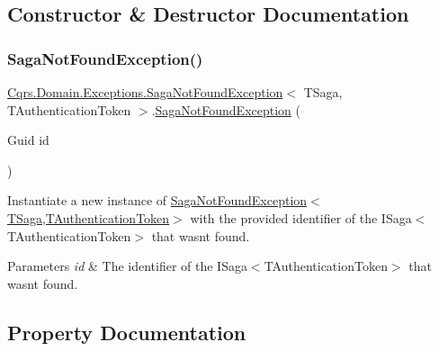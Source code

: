 \subsection{Constructor \& Destructor Documentation}
\mbox{\label{classCqrs_1_1Domain_1_1Exceptions_1_1SagaNotFoundException_a329725b9034ccf3167b667383fb8718a_a329725b9034ccf3167b667383fb8718a}} 
\subsubsection{\texorpdfstring{Saga\+Not\+Found\+Exception()}{SagaNotFoundException()}}
{\footnotesize\ttfamily \hyperlink{classCqrs_1_1Domain_1_1Exceptions_1_1SagaNotFoundException}{Cqrs.\+Domain.\+Exceptions.\+Saga\+Not\+Found\+Exception}$<$ T\+Saga, T\+Authentication\+Token $>$.\hyperlink{classCqrs_1_1Domain_1_1Exceptions_1_1SagaNotFoundException}{Saga\+Not\+Found\+Exception} (\begin{DoxyParamCaption}\item[{Guid}]{id }\end{DoxyParamCaption})}



Instantiate a new instance of \hyperlink{classCqrs_1_1Domain_1_1Exceptions_1_1SagaNotFoundException_a329725b9034ccf3167b667383fb8718a_a329725b9034ccf3167b667383fb8718a}{Saga\+Not\+Found\+Exception$<$\+T\+Saga,\+T\+Authentication\+Token$>$} with the provided identifier of the I\+Saga$<$\+T\+Authentication\+Token$>$ that wasn\textquotesingle{}t found. 


\begin{DoxyParams}{Parameters}
{\em id} & The identifier of the I\+Saga$<$\+T\+Authentication\+Token$>$ that wasn\textquotesingle{}t found.\\
\hline
\end{DoxyParams}


\subsection{Property Documentation}
\mbox{\label{classCqrs_1_1Domain_1_1Exceptions_1_1SagaNotFoundException_a0493324fdfb3ffd3225cd28c4d03edfc_a0493324fdfb3ffd3225cd28c4d03edfc}} 
